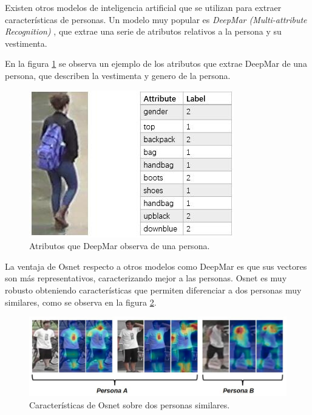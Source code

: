 
Existen otros modelos de inteligencia artificial que se utilizan para extraer características de personas. Un modelo muy popular es \textit{DeepMar (Multi-attribute Recognition)} \citep{DEEPMAR}, que extrae una serie de atributos relativos a la persona y su vestimenta. 

En la figura \ref{fig:deepmar} se observa un ejemplo de los atributos que extrae DeepMar de una persona, que describen la vestimenta y  genero de la persona.

\begin{figure}[ht]
	\centering
	\includegraphics[scale=.8]{./Figures/deepmar.png}
	\caption{Atributos que DeepMar observa de una persona\protect\footnotemark.}
	\label{fig:deepmar}
\end{figure}



\newpage

La ventaja de Osnet respecto a otros modelos como DeepMar es que sus vectores son más representativos, caracterizando mejor a las personas. Osnet es muy robusto obteniendo características que permiten diferenciar a dos personas muy similares, como se observa en la figura \ref{fig:osnetDosPersonas}.

\begin{figure}[ht]
	\centering
	\includegraphics[scale=0.5]{./Figures/osnetDosPersonas.jpg}
	\caption{Características de Osnet sobre dos personas similares\protect\footnotemark.}
	\label{fig:osnetDosPersonas}
\end{figure}

